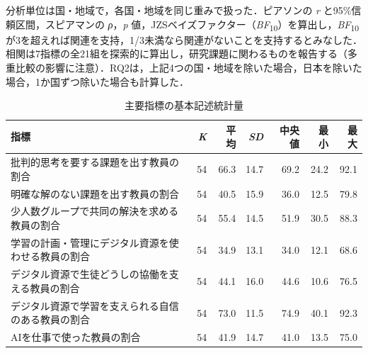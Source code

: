 \documentclass[a4paper,10pt,twocolumn]{ltjsarticle}
\begin{document}
分析単位は国・地域で，各国・地域を同じ重みで扱った．ピアソンの \textit{r} と95\%信頼区間，スピアマンの \textit{ρ}，\textit{p} 値，JZSベイズファクター（\textit{BF}\textsubscript{10}）を算出し，\textit{BF}\textsubscript{10}が3を超えれば関連を支持，1/3未満なら関連がないことを支持するとみなした．相関は7指標の全21組を探索的に算出し，研究課題に関わるものを報告する（多重比較の影響に注意）．RQ2は，上記4つの国・地域を除いた場合，日本を除いた場合，1か国ずつ除いた場合も計算した．
\begin{table}[!t]
\caption{主要指標の基本記述統計量}
\centering\small
\begin{tabular}{>{\raggedright\arraybackslash}p{9.2cm}rrrrrr}
\toprule
指標 & \textit{K} & 平均 & \textit{SD} & 中央値 & 最小 & 最大 \\
\midrule
批判的思考を要する課題を出す教員の割合 & 54 & 66.3 & 14.7 & 69.2 & 24.2 & 92.1 \\
明確な解のない課題を出す教員の割合 & 54 & 40.5 & 15.9 & 36.0 & 12.5 & 79.8 \\
少人数グループで共同の解決を求める教員の割合 & 54 & 55.4 & 14.5 & 51.9 & 30.5 & 88.3 \\
学習の計画・管理にデジタル資源を使わせる教員の割合 & 54 & 34.9 & 13.1 & 34.0 & 12.1 & 68.6 \\
デジタル資源で生徒どうしの協働を支える教員の割合 & 54 & 44.1 & 16.0 & 44.6 & 10.6 & 76.5 \\
デジタル資源で学習を支えられる自信のある教員の割合 & 54 & 73.0 & 11.5 & 74.9 & 40.1 & 92.3 \\
AIを仕事で使った教員の割合 & 54 & 41.9 & 14.7 & 41.0 & 13.5 & 75.0 \\
\bottomrule
\end{tabular}
\par{}
\end{table}
\end{document}
